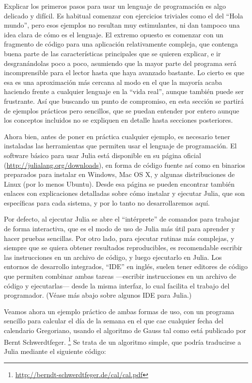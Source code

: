 Explicar los primeros pasos para usar un lenguaje de programación es algo delicado y difícil. Es habitual comenzar con ejercicios triviales como el del ``Hola mundo'', pero esos ejemplos no resultan muy estimulantes, ni dan tampoco una idea clara de cómo es el lenguaje. El extremo opuesto es comenzar con un fragmento de código para una aplicación relativamente compleja, que contenga buena parte de las características principales que se quieren explicar, e ir desgranándolas poco a poco, asumiendo que la mayor parte del programa será incomprensible para el lector hasta que haya avanzado bastante. Lo cierto es que esa es una aproximación más cercana al modo en el que la mayoría acaba haciendo frente a cualquier lenguaje en la ``vida real'', aunque también puede ser frustrante. Así que buscando un punto de compromiso, en esta sección se partirá de ejemplos prácticos pero sencillos, que se puedan entender por entero aunque los conceptos incluidos no se expliquen en detalle hasta secciones posteriores.

Ahora bien, antes de poner en práctica cualquier ejemplo, es necesario tener instaladas las herramientas que permiten usar el lenguaje de programación. El software básico para usar Julia está disponible en su página oficial (\url{http://julialang.org/downloads}), en forma de código fuente así como en binarios preparados para instalar en Windows, Mac OS X, y algunas distribuciones de Linux (por lo menos Ubuntu). Desde esa página se pueden encontrar también enlaces con explicaciones detalladas sobre cómo instalar y ejecutar Julia, que son específicas para cada sistema, y por lo tanto no desarrollaremos aquí.

Por defecto, al ejecutar Julia se abre el ``intérprete'' de comandos para trabajar de forma interactiva, que es el modo de uso de Julia más útil para aprender y hacer pruebas sencillas. Por otro lado, para ejecutar rutinas más complejas, y siempre que se quiera obtener resultados reproducibles, es recomendable escribir las instrucciones en un archivo de código, y luego ejecutarlo en Julia. Los entornos de desarrollo integrados, ``IDE'' en inglés, suelen tener editores de código que permiten combinar ambas tareas ---escribir instrucciones en un archivo de código y ejecutarlas--- desde la misma interfaz, lo cual facilita el trabajo del programador. (Véase más abajo sobre algunos IDE para Julia.)

Veamos ahora un ejemplo práctico de ambas formas de uso, con un programa sencillo para calcular el día de la semana en el que cae cualquier fecha del calendario Gregoriano, usando el algoritmo de Gauss tal como está publicado por Bernt Schwerdtfeger.%
\footnote{%
\url{http://berndt-schwerdtfeger.de/cal/cal.pdf}%
} Se trata de un algoritmo simple, que podría traducirse a Julia mediante el siguiente código: 

